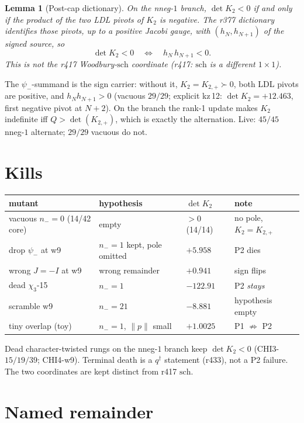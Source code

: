 \documentclass[11pt]{article}
\newtheorem{lemma}{Lemma}
\theoremstyle{remark}
\newcommand{\psim}{\psi_{-}}
\newcommand{\Kp}{K_{2,+}}
\begin{document}
\begin{lemma}[Post-cap dictionary]\label{lem:alt}
On the nneg-$1$ branch, $\det K_{2}<0$ if and only if the
product of the two LDL pivots of $K_{2}$ is negative.
The r377 dictionary identifies those pivots, up to a positive
Jacobi gauge, with $(h_{N},h_{N+1})$ of the signed source, so
\[
\det K_{2}<0
\quad\Longleftrightarrow\quad
h_{N}\,h_{N+1}<0.
\]
This is not the r417 Woodbury-$\mathrm{sch}$ coordinate
(r417: $\mathrm{sch}$ is a different $1\times 1$).
\end{lemma}

The $\psim$-summand is the sign carrier: without it,
$K_{2}=\Kp\succ 0$, both LDL pivots are positive, and
$h_{N}h_{N+1}>0$ (vacuous $29/29$; explicit kz\,12:
$\det K_{2}=+12.463$, first negative pivot at $N+2$).
On the branch the rank-1 update makes $K_{2}$ indefinite
iff $Q>\det(\Kp)$, which is exactly the alternation.
Live: $45/45$ nneg-$1$ alternate; $29/29$ vacuous do not.

\section{Kills}\label{sec:kills}

\begin{center}
\begin{tabular}{llll}
\toprule
mutant & hypothesis & $\det K_{2}$ & note \\
\midrule
vacuous $n_{-}=0$ (14/42 core) & empty & $>0$ (14/14) & no pole, $K_{2}=\Kp$ \\
drop $\psim$ at w9 & $n_{-}=1$ kept, pole omitted & $+5.958$ & P2 dies \\
wrong $J=-I$ at w9 & wrong remainder & $+0.941$ & sign flips \\
dead $\chi_{3}$-15 & $n_{-}=1$ & $-122.91$ & P2 \emph{stays} \\
scramble w9 & $n_{-}=21$ & $-8.881$ & hypothesis empty \\
tiny overlap (toy) & $n_{-}=1$, $\|p\|$ small & $+1.0025$ & P1 $\not\Rightarrow$ P2 \\
\bottomrule
\end{tabular}
\end{center}

Dead character-twisted rungs on the nneg-$1$ branch keep
$\det K_{2}<0$ (CHI3-$15/19/39$; CHI4-w9).  Terminal death is a
$q^{\dagger}$ statement (r433), not a P2 failure.  The two
coordinates are kept distinct from r417 $\mathrm{sch}$.

\section{Named remainder}\label{sec:rem}
\end{document}
